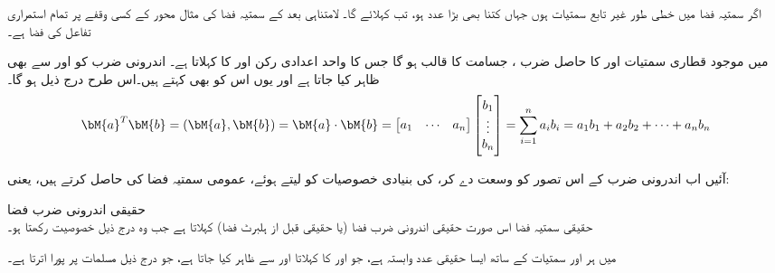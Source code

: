 اگر سمتیہ فضا   میں  خطی طور غیر تابع  سمتیات ہوں جہاں  کتنا بھی بڑا عدد ہو، تب   کہلائے گا۔ لامتناہی بعد کے   سمتیہ فضا کی مثال محور  کے کسی وقفے  پر تمام استمراری تفاعل کی فضا ہے۔ 

 میں موجود قطاری سمتیات  اور  کا  حاصل ضرب ، جسامت  کا قالب ہو گا جس کا واحد اعدادی رکن  اور  کا  کہلاتا ہے۔ اندرونی ضرب کو  اور  سے بھی ظاہر کیا جاتا ہے اور یوں اس کو   بھی کہتے ہیں۔اس طرح درج ذیل ہو گا۔
\begin{align}
\bM{a}^T\bM{b}=(\bM{a},\bM{b})=\bM{a}\cdot \bM{b}=\begin{bmatrix} a_1&\cdots&a_n \end{bmatrix} \begin{bmatrix}b_1\\\vdots\\ b_n  \end{bmatrix}=\sum_{i=1}^{n}a_i b_i=a_1b_1+a_2b_2+\cdots+a_nb_n
\end{align}

آئیں اب اندرونی ضرب کے اس تصور کو وسعت دے کر،  کی بنیادی خصوصیات کو لیتے ہوئے، عمومی سمتیہ فضا کی   حاصل کرتے ہیں، یعنی:

\quad حقیقی اندرونی ضرب فضا\\
حقیقی سمتیہ فضا  اس صورت حقیقی اندرونی ضرب فضا (یا حقیقی قبل از ہلبرٹ فضا) کہلاتا ہے جب وہ درج ذیل خصوصیت رکھتا ہو۔

 میں ہر  اور  سمتیات کے ساتھ ایسا حقیقی عدد وابستہ ہے، جو  اور  کا  کہلاتا اور  سے ظاہر کیا جاتا ہے،  جو درج ذیل  مسلمات پر پورا اترتا ہے۔
 
